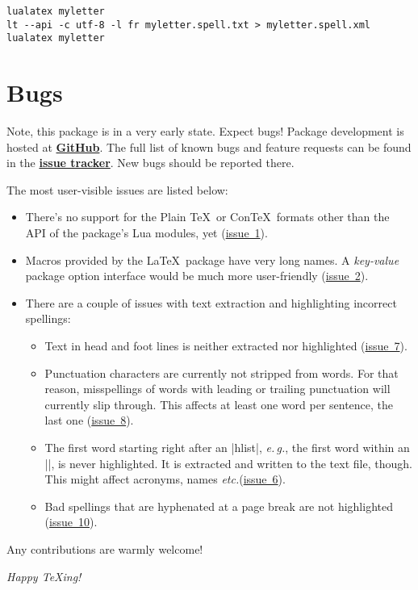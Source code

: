 \documentclass[11pt]{article}
\newcommand*{\acr}[1]{\mbox{\scshape#1}}
\newcommand*{\latinphrase}[1]{\foreignlanguage{latin}{\emph{#1}}}
\newcommand*{\lpeg}{\latinphrase{e.\,g.}\xspace}
\newcommand*{\lpetc}{\latinphrase{etc.}\xspace}
\begin{document}
\begin{lstlisting}
lualatex myletter
lt --api -c utf-8 -l fr myletter.spell.txt > myletter.spell.xml
lualatex myletter
\end{lstlisting}


\section{Bugs}
\label{sec:bugs}

Note, this package is in a very early state.  Expect bugs!  Package
development is hosted at
\href{http://github.com/sh2d/spelling/}{\bfseries GitHub}.  The full
list of known bugs and feature requests can be found in the
\href{http://github.com/sh2d/spelling/issues/}{\bfseries issue tracker}.
New bugs should be reported there.

The most user-visible issues are listed below:

\begin{itemize}

\item There's no support for the Plain \TeX\ or Con\TeX\ formats other
  than the \acr{API} of the package's Lua modules, yet
  (\href{https://github.com/sh2d/spelling/issues/1}{issue~1}).

\item Macros provided by the \LaTeX\ package have very long names.  A
  \emph{key-value} package option interface would be much more
  user-friendly
  (\href{https://github.com/sh2d/spelling/issues/2}{issue~2}).

\item There are a couple of issues with text extraction and highlighting
  incorrect spellings:

  \begin{itemize}

  \item Text in head and foot lines is neither extracted nor highlighted
    (\href{https://github.com/sh2d/spelling/issues/7}{issue~7}).

  \item Punctuation characters are currently not stripped from words.
    For that reason, misspellings of words with leading or trailing
    punctuation will currently slip through.  This affects at least one
    word per sentence, the last one
    (\href{https://github.com/sh2d/spelling/issues/8}{issue~8}).

  \item The first word starting right after an |hlist|, \lpeg, the first
    word within an |\mbox|, is never highlighted.  It is extracted and
    written to the text file, though.  This might affect acronyms, names
    \lpetc (\href{https://github.com/sh2d/spelling/issues/6}{issue~6}).

  \item Bad spellings that are hyphenated at a page break are not
    highlighted
    (\href{https://github.com/sh2d/spelling/issues/10}{issue~10}).

  \end{itemize}


\end{itemize}

Any contributions are warmly welcome!

\bigskip
\emph{Happy \TeX ing!}
\end{document}
